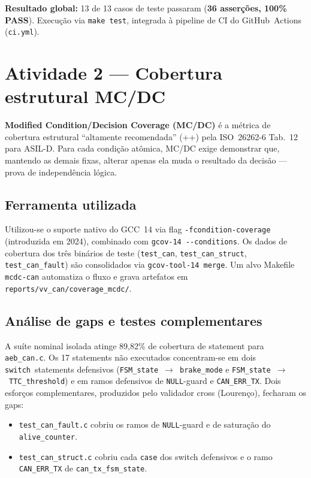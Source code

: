 \documentclass[12pt]{article}
\begin{document}
\begin{tcolorbox}[colback=green!5, colframe=green!50!black]
\textbf{Resultado global:} 13 de 13 casos de teste passaram (\textbf{36 asserções,
100\% PASS}). Execução via \texttt{make test}, integrada à pipeline de CI do
GitHub~Actions (\texttt{ci.yml}).
\end{tcolorbox}

\section{Atividade 2 --- Cobertura estrutural MC/DC}

\textbf{Modified Condition/Decision Coverage (MC/DC)} é a métrica de cobertura estrutural ``altamente
recomendada'' (++) pela ISO~26262-6 Tab.~12 para ASIL-D. Para cada condição atômica, MC/DC exige
demonstrar que, mantendo as demais fixas, alterar apenas ela muda o resultado da decisão --- prova de
independência lógica.

\subsection{Ferramenta utilizada}

Utilizou-se o suporte nativo do GCC~14 via flag \texttt{-fcondition-coverage} (introduzida em 2024),
combinado com \texttt{gcov-14 -{}-conditions}. Os dados de cobertura dos três binários de teste
(\texttt{test\_can}, \texttt{test\_can\_struct}, \texttt{test\_can\_fault}) são consolidados via
\texttt{gcov-tool-14 merge}. Um alvo Makefile \texttt{mcdc-can} automatiza o fluxo e grava artefatos em
\texttt{reports/vv\_can/coverage\_mcdc/}.

\subsection{Análise de gaps e testes complementares}

A suíte nominal isolada atinge 89{,}82\% de cobertura de statement para \texttt{aeb\_can.c}. Os 17
statements não executados concentram-se em dois \texttt{switch}~statements defensivos
(\texttt{FSM\_state}~$\rightarrow$~\texttt{brake\_mode} e
\texttt{FSM\_state}~$\rightarrow$~\texttt{TTC\_threshold}) e em ramos defensivos de \texttt{NULL}-guard
e \texttt{CAN\_ERR\_TX}. Dois esforços complementares, produzidos pelo validador cross (Lourenço),
fecharam os gaps:

\begin{itemize}[leftmargin=1.2em, itemsep=2pt]
\item \texttt{test\_can\_fault.c} cobriu os ramos de \texttt{NULL}-guard e de saturação do
      \texttt{alive\_counter}.
\item \texttt{test\_can\_struct.c} cobriu cada \texttt{case} dos switch defensivos e o ramo \texttt{CAN\_ERR\_TX} de \texttt{can\_tx\_fsm\_state}.
\end{itemize}
\end{document}
